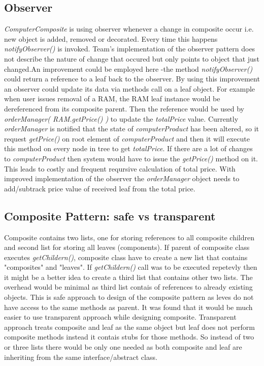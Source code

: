 \documentclass[pdftex,11pt,a4paper]{article}
\begin{document}
\subsection{Observer}
\emph{ComputerComposite}  is using observer whenever a change in composite occur i.e. new object is added,  removed or decorated. Every time this happens \emph{notifyObserver()} is invoked. Team's implementation of the observer pattern does not describe the nature of change that occured but only points to object that just changed.An improvement could be employed here -the method \emph{notifyObserver()} could return a reference to a leaf back to the observer. By using this improvement an observer could update its data via methods call on a leaf object. For example when user issues removal of a RAM, the RAM leaf instance would be dereferenced from its composite parent. Then the reference would be used by \emph{orderManager( RAM.getPrice() )} to update the \emph{totalPrice} value.
Currently \emph{orderManager} is notified that the state of \emph{computerProduct} has been altered, so it request \emph{getPrice()} on root element of \emph{computerProduct} and then it will execute this method on every node in tree to get \emph{totalPrice}.
If there are a lot of changes to \emph{computerProduct} then system would have to issue the \emph{getPrice()} method on it. This leads to costly and frequent reqursive calculation of total price. With improved implementation of the observer the \emph{orderManager} object needs to add/subtrack price value of received leaf from the total price.

\subsection{Composite Pattern: safe vs transparent}
Composite contains two lists, one for storing references to all composite children and second list for storing all leaves (components). If parent of composite class executes \emph{getChildern()}, composite class have to create a new list that contains "composites" and "leaves".
If \emph{getChildern()} call was to be executed repetevly then it might be a better idea to create a third list that contains other two lists. The overhead would be minimal as third list contais of references to already existing objects.
This is safe approach to design of the composite pattern as leves do not have access to the same methods as parent. It was found that it would be much easier to use transparent approach while designing composite. Transparent approach treats composite and leaf as the same object but leaf does not perform composite methods instead it contais stubs for those methods. So instead of two or three lists there would be only one needed as both composite and leaf are inheriting from the same interface/abstract class.
\end{document}
